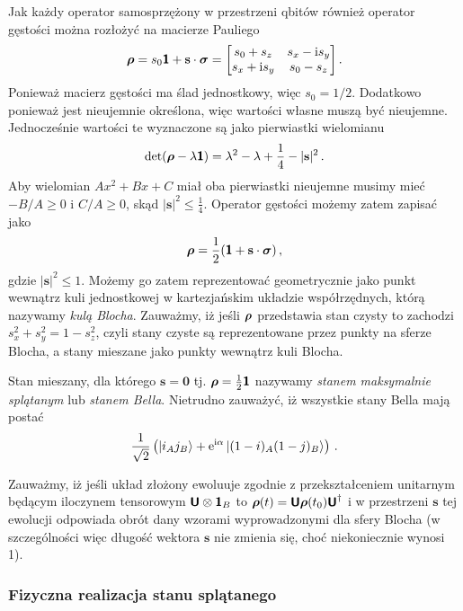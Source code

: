 \documentclass{myclass}
\begin{document}
Jak każdy operator samosprzężony w przestrzeni qbitów również operator gęstości można rozłożyć na
macierze Pauliego
\begin{equation*}
    \oper{\rho} = s_0\oper{1} + \mathbf{s}\cdot\oper{\sigma} = \mqty[s_0 + s_z & s_x - \im s_y\\ s_x + \im s_y & s_0 - s_z]\,.
\end{equation*}
Ponieważ macierz gęstości ma ślad jednostkowy, więc \(s_0 = 1/2\). Dodatkowo ponieważ jest
nieujemnie określona, więc wartości własne muszą być nieujemne. Jednocześnie wartości te wyznaczone
są jako pierwiastki wielomianu
\begin{equation*}
    \det(\boldsymbol{\mathsf{\rho}} - \lambda\boldsymbol{\mathsf{1}}) = \lambda^2 - \lambda + \frac{1}{4} - |\mathbf{s}|^2\,.
\end{equation*}
Aby wielomian \(Ax^2 + Bx + C\) miał oba pierwiastki nieujemne musimy mieć \(-B/A \geq 0\) i \(C/A
\geq 0\), skąd \(|\mathbf{s}|^2 \leq \frac{1}{4}\). Operator gęstości możemy zatem zapisać jako
\begin{equation*}
    \boldsymbol{\mathsf{\rho}} = \frac{1}{2}(\boldsymbol{\mathsf{1}} + \mathbf{s}\cdot\boldsymbol{\mathsf{\sigma}})\,,
\end{equation*}
gdzie \(|\mathbf{s}|^2 \leq 1\). Możemy go zatem reprezentować geometrycznie jako punkt wewnątrz
kuli jednostkowej w kartezjańskim układzie współrzędnych, którą nazywamy \textit{kulą Blocha}.
Zauważmy, iż jeśli \(\boldsymbol{\mathsf{\rho}}\) przedstawia stan czysty to zachodzi \(s_x^2 + s_y^2 = 1 -
s_z^2\), czyli stany czyste są reprezentowane przez punkty na sferze Blocha, a stany mieszane jako
punkty wewnątrz kuli Blocha. 

Stan mieszany, dla którego \(\mathbf{s} = \mathbf{0}\) tj. \(\boldsymbol{\mathsf{\rho}} = \frac{1}{2}\boldsymbol{\mathsf{1}}\)
nazywamy \textit{stanem maksymalnie splątanym} lub \textit{stanem Bella}. Nietrudno zauważyć, iż
wszystkie stany Bella mają postać
\begin{equation*}
    \frac{1}{\sqrt{2}}\left(\ket{i_Aj_B} + \mathrm{e}^{\mathrm{i}\alpha}\ket{(1-i)_A(1-j)_B}\right)\,.
\end{equation*}

Zauważmy, iż jeśli układ złożony ewoluuje zgodnie z przekształceniem unitarnym będącym iloczynem
tensorowym \(\boldsymbol{\mathsf{U}}\otimes\boldsymbol{\mathsf{1}}_B\) to \(\boldsymbol{\mathsf{\rho}}(t) =
\boldsymbol{\mathsf{U}}\boldsymbol{\mathsf{\rho}}(t_0)\boldsymbol{\mathsf{U}}^\dagger\) i w przestrzeni \(\mathbf{s}\) tej ewolucji odpowiada
obrót dany wzorami wyprowadzonymi dla sfery Blocha (w szczególności więc długość wektora
\(\mathbf{s}\) nie zmienia się, choć niekoniecznie wynosi 1).


\subsubsection{Fizyczna realizacja stanu splątanego}
\end{document}
